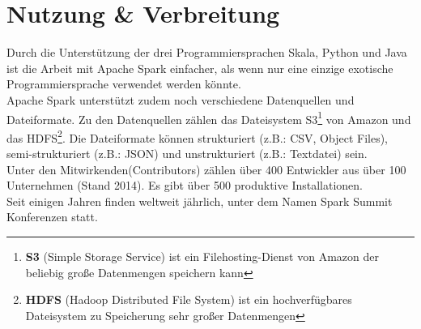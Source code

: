 \newpage
\section{Nutzung \& Verbreitung}
Durch die Unterstützung der drei Programmiersprachen Skala, Python und Java ist die Arbeit mit Apache Spark einfacher, als wenn nur eine einzige exotische Programmiersprache verwendet werden könnte. \\



\noindent
Apache Spark unterstützt zudem noch verschiedene Datenquellen und Dateiformate.  Zu den Datenquellen zählen das Dateisystem S3\footnote{\textbf{S3} (Simple Storage Service) ist ein Filehosting-Dienst von Amazon der beliebig große Datenmengen speichern kann} von Amazon und das HDFS\footnote{\textbf{HDFS} (Hadoop Distributed File System) ist ein hochverfügbares Dateisystem zu Speicherung sehr großer Datenmengen}.
Die Dateiformate können strukturiert (z.B.: CSV, Object Files), semi-strukturiert (z.B.: JSON) und unstrukturiert (z.B.: Textdatei) sein.\\

\noindent
Unter den Mitwirkenden(Contributors) zählen über 400 Entwickler aus über 100 Unternehmen (Stand 2014). Es gibt über 500 produktive Installationen. \cite{ADD+15} \\ %

\noindent
Seit einigen Jahren finden weltweit jährlich, unter dem Namen \glqq{}Spark Summit\grqq{} Konferenzen statt.\cite{SPCOM}\\



